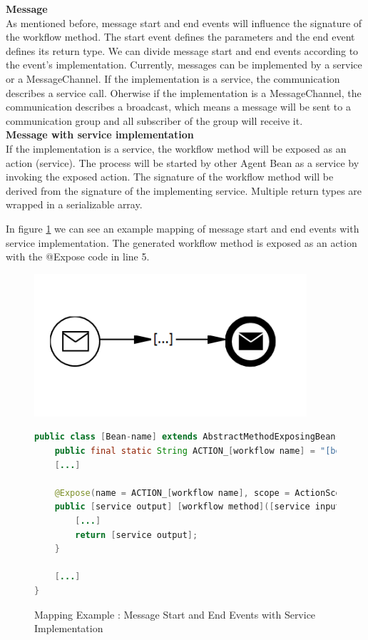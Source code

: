 \newpage
\textbf{Message}\\
As mentioned before, message start and end events will influence the signature of the workflow method. The start event defines the parameters and the end event defines its return type. We can divide message start and end events according to the event's implementation. Currently, messages can be implemented by a service or a MessageChannel. If the implementation is a service, the communication describes a service call. Oherwise if the implementation is a MessageChannel, the communication describes a broadcast, which means a message will be sent to a communication group and all subscriber of the group will receive it. \\


\textbf{Message with service implementation}\\
If the implementation is a service, the workflow method will be exposed as an action (service). The process will be started by other Agent Bean as a service by invoking the exposed action. The signature of the workflow method will be derived from the signature of the implementing service. 
Multiple return types are wrapped in a serializable array. 

In figure \ref{fig:message_service} we can see an example mapping of message start and end events with service implementation. The generated workflow method is exposed as an action with the @Expose code in line 5. \\
\begin{figure}[h]
\begin{minipage}[c]{0.35\textwidth}
\includegraphics[width=0.9\textwidth]{images/mapping/messageStart.png}
\end{minipage}
\begin{minipage}[c]{0.65\textwidth}
\begin{lstlisting}[language = Java]
public class [Bean-name] extends AbstractMethodExposingBean{
	public final static String ACTION_[workflow name] = "[bean fullname]#[workflow method]"; 
	[...]
	
	@Expose(name = ACTION_[workflow name], scope = ActionScope.GLOBAL)
	public [service output] [workflow method]([service inputs]){
		[...]
		return [service output];
	}
	
	[...]
}
\end{lstlisting}
\end{minipage}
\caption{Mapping Example : Message Start and End Events with Service Implementation}%
\label{fig:message_service}
\end{figure}

